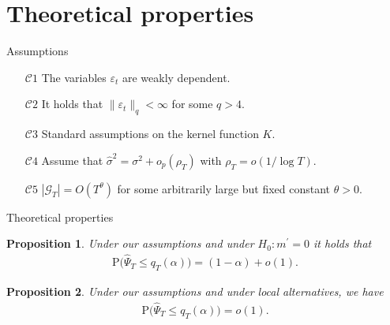 \documentclass[10pt]{beamer}
\newcommand{\Prob}{\mathrm{P}}
\newtheorem{prop}{Proposition}
\begin{document}
\section{Theoretical properties}
\begin{frame}{Assumptions}
\begin{itemize}
\item[$\mathcal{C}1$] \label{C-err1} The variables $\varepsilon_t$ are weakly dependent.
\item[$\mathcal{C}2$] \label{C-err2} It holds that $\| \varepsilon_t \|_q < \infty$ for some $q > 4$.
\item[$\mathcal{C}3$] \label{C-ker} Standard assumptions on the kernel function $K$.
\item[$\mathcal{C}4$] Assume that  $\widehat{\sigma}^2 = \sigma^2 + o_p(\rho_T)$ with $\rho_T = o(1/\log T)$.
\item[$\mathcal{C}5$] \label{C-grid} $|\mathcal{G}_T| = O(T^\theta)$ for some arbitrarily large but fixed constant $\theta > 0$.
\end{itemize}
\end{frame}

\begin{frame}{Theoretical properties}
\begin{prop}\label{prop-shape-1}
Under our assumptions and under $H_0: m^{\prime}= 0$ it holds that 
\vspace{-3mm}
\begin{align*}
\Prob \big( \widehat{\Psi}_T \le q_T(\alpha) \big) = (1 - \alpha) + o(1).
\end{align*}
\end{prop}\pause
\begin{prop}\label{prop-shape-2}
Under our assumptions and under local alternatives, we have 
\vspace{-3mm}
\begin{align*}
\Prob \big( \widehat{\Psi}_T \le q_T(\alpha) \big) = o(1).
\end{align*}
\end{prop}
\end{frame}
\end{document}
